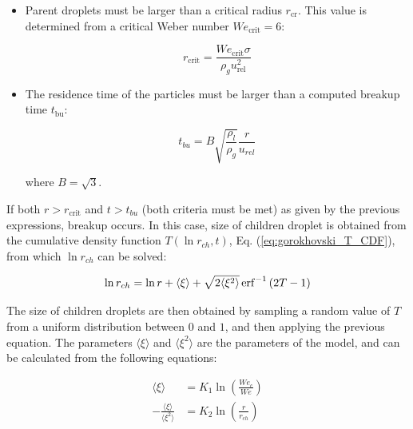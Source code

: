 \begin{itemize}

	\item Parent droplets must be larger than a critical radius $r_\mathrm{cr}$. This value is determined from a critical Weber number $We_\mathrm{crit} = 6$:
	
	\begin{equation}
	r_\mathrm{crit} = \frac{We_\mathrm{crit} \sigma}{\rho_g u_\mathrm{rel}^2}
	\end{equation}
	
	\item The residence time of the particles must be larger than a computed breakup time $t_\mathrm{bu}$:
	
	\begin{equation}
	t_{bu} = B \sqrt{\frac{\rho_l}{\rho_g}} \frac{r}{u_{rel}}
	\end{equation}
	
	where $B = \sqrt{3}$.

\end{itemize}

If both $r > r_\mathrm{crit}$ and $t > t_{bu}$ (both criteria must be met) as given by the previous expressions, breakup occurs. In this case, size of children droplet is obtained from the cumulative density function $T \left( \ln r_{ch}, t \right)$, Eq. (\ref{eq:gorokhovski_T_CDF}), from which $\ln r_{ch}$ can be solved:
 
 
\begin{equation}
\ln r_{ch} = \ln r + \langle \xi \rangle  + \sqrt{2 \langle \xi^2 \rangle} \operatorname{erf}^{-1} \left(  2 T - 1 \right)
\end{equation}

The size of children droplets are then obtained by sampling a random value of $T$ from a uniform distribution between $0$ and $1$, and then applying the previous equation. The parameters $\langle \xi \rangle$ and $\langle \xi^2 \rangle$ are the parameters of the model, and can be calculated from the following equations:

\begin{subequations}
\label{eq:gorokhovski_epsilon_parameters_definition}
\begin{align}
\langle \xi \rangle &=  K_1 \ln \left(  \frac{We_c}{We}  \right) \\
- \frac{\langle \xi \rangle}{\langle \xi^2 \rangle} &=  K_2 \ln \left( \frac{r}{r_{ch}} \right)
\end{align}
\end{subequations}

